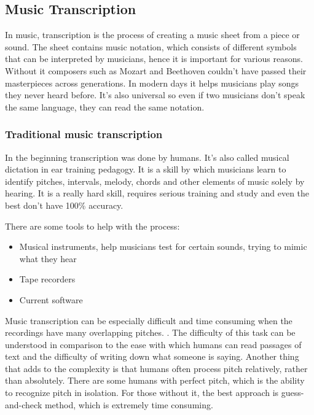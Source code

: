 \subsection{Music Transcription}
In music, transcription is the process of creating a music sheet from a piece or sound. The sheet contains music notation, which consists of different symbols that can be interpreted by musicians, hence it is important for various reasons. Without it composers such as Mozart and Beethoven couldn't have passed their masterpieces across generations. In modern days it helps musicians play songs they never heard before. It's also universal so even if two musicians don't speak the same language, they can read the same notation.

\subsubsection{Traditional music transcription}
In the beginning transcription was done by humans. It's also called musical dictation in ear training pedagogy. \cite{human_transcription} It is a skill by which musicians learn to identify pitches, intervals, melody, chords and other elements of music solely by hearing. It is a really hard skill, requires serious training and study and even the best don't have 100\% accuracy. \par

There are some tools to help with the process:
\begin{itemize}
	\item Musical instruments, help musicians test for certain sounds, trying to mimic what they hear
	\item Tape recorders
	\item Current software
\end{itemize}
\par

Music transcription can be especially difficult and time consuming when the recordings have many overlapping pitches.
\cite{music_retrieval}. The difficulty of this task can be understood in comparison to the ease with which humans can read passages of text and the difficulty of writing down what someone is saying. Another thing that adds to the complexity is that humans often process pitch relatively, rather than absolutely. There are some humans with perfect pitch, which is the ability to recognize pitch in isolation. For those without it, the best approach is guess-and-check method, which is extremely time consuming.

